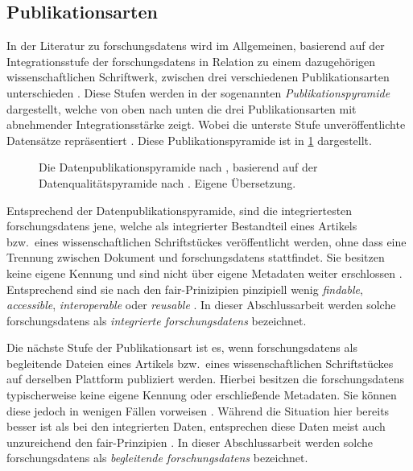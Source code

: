 \subsection{Publikationsarten}\label{sec:forschungsstand-basics-publicationtypes}
In der Literatur zu \glspl{forschungsdaten} wird im Allgemeinen, basierend auf der Integrationsstufe der \glspl{forschungsdaten} in Relation zu einem dazugehörigen wissenschaftlichen Schriftwerk, zwischen drei verschiedenen Publikationsarten unterschieden \autocite{ReillyEtAl2011}.
Diese Stufen werden in der sogenannten \textit{Publikationspyramide} dargestellt, welche von oben nach unten die drei Publikationsarten mit abnehmender Integrationsstärke zeigt. 
Wobei die unterste Stufe unveröffentlichte Datensätze repräsentiert \autocite{ReillyEtAl2011}.
Diese Publikationspyramide ist in \cref{fig:data-pyramid} dargestellt.
\begin{figure}[!htbp]
    \centering
    \resizebox{.8\textwidth}{!}{}
    \caption{Die Datenpublikationspyramide nach \citeauthor{ReillyEtAl2011} \autocite{ReillyEtAl2011}, basierend auf der Datenqualitätspyramide nach \citeauthor{Gray2009} \autocite{Gray2009}.
    Eigene Übersetzung.}
    \label{fig:data-pyramid}
\end{figure}

Entsprechend der Datenpublikationspyramide, sind die integriertesten \glspl{forschungsdaten} jene, welche als integrierter Bestandteil eines Artikels bzw.~eines wissenschaftlichen Schriftstückes veröffentlicht werden, ohne dass eine Trennung zwischen Dokument und \glspl{forschungsdaten} stattfindet.
Sie besitzen keine eigene Kennung und sind nicht über eigene Metadaten weiter erschlossen \autocite{ReillyEtAl2011}.
Entsprechend sind sie nach den \gls{fair}-Prinizipien pinzipiell wenig \textit{findable}, \textit{accessible}, \textit{interoperable} oder \textit{reusable} \autocite[vgl.][]{ReillyEtAl2011}.
In dieser Abschlussarbeit werden solche \glspl{forschungsdaten} als \textit{integrierte \glspl{forschungsdaten}} bezeichnet.

Die nächste Stufe der Publikationsart ist es, wenn \glspl{forschungsdaten} als begleitende Dateien eines Artikels bzw.~eines wissenschaftlichen Schriftstückes auf derselben Plattform publiziert werden.
Hierbei besitzen die \glspl{forschungsdaten} typischerweise keine eigene Kennung oder erschließende Metadaten.
Sie können diese jedoch in wenigen Fällen vorweisen \autocite{ReillyEtAl2011}.
Während die Situation hier bereits besser ist als bei den integrierten Daten, entsprechen diese Daten meist auch unzureichend den \gls{fair}-Prinzipien \autocite[vgl.][]{ReillyEtAl2011}.
In dieser Abschlussarbeit werden solche \glspl{forschungsdaten} als \textit{begleitende \glspl{forschungsdaten}} bezeichnet.

